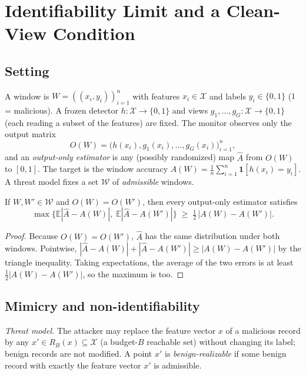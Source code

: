 \section{Identifiability Limit and a Clean-View Condition}\label{sec:ident}

\subsection{Setting}
A window is $W=((x_i,y_i))_{i=1}^{n}$ with features $x_i\in\mathcal X$ and labels $y_i\in\{0,1\}$ ($1$ = malicious). A frozen detector $h:\mathcal X\to\{0,1\}$ and views
$g_1,\dots,g_G:\mathcal X\to\{0,1\}$ (each reading a subset of the features) are fixed. The monitor observes only the output matrix
\[
O(W)=\big(h(x_i),g_1(x_i),\dots,g_G(x_i)\big)_{i=1}^{n},
\]
and an \emph{output-only estimator} is any (possibly randomized) map $\hat A$ from $O(W)$ to $[0,1]$. The target is the window accuracy
$A(W)=\frac1n\sum_{i=1}^{n}\mathbf 1[h(x_i)=y_i]$. A threat model fixes a set $\mathcal W$ of \emph{admissible} windows.

\begin{proposition}\label{prop:twopoint}
If $W,W'\in\mathcal W$ and $O(W)=O(W')$, then every output-only estimator satisfies
\[
\max\big\{\mathbb E|\hat A-A(W)|,\;\mathbb E|\hat A-A(W')|\big\}\;\ge\;\tfrac12\,|A(W)-A(W')|.
\]
\end{proposition}
\begin{proof}
Because $O(W)=O(W')$, $\hat A$ has the same distribution under both windows. Pointwise, $|\hat A-A(W)|+|\hat A-A(W')|\ge|A(W)-A(W')|$ by the triangle inequality. Taking expectations, the average of the two errors is at least $\frac12|A(W)-A(W')|$, so the maximum is too.
\end{proof}

\subsection{Mimicry and non-identifiability}
\emph{Threat model.} The attacker may replace the feature vector $x$ of a malicious record by any $x'\in R_B(x)\subseteq\mathcal X$ (a budget-$B$ reachable set) without changing its label; benign records are not modified. A point $x'$ is \emph{benign-realizable} if some benign record with exactly the feature vector $x'$ is admissible.

